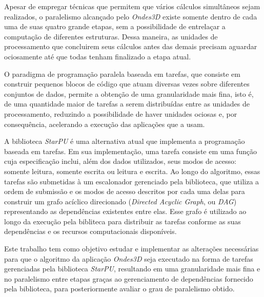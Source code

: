 \documentclass[cic,tc]{iiufrgs}
\begin{document}
Apesar de empregar técnicas que permitem que vários cálculos simultâneos sejam realizados, o paralelismo alcançado pelo \textit{Ondes3D} existe somente dentro de cada uma de suas
quatro grande etapas, sem a possibilidade de entrelaçar a computação de diferentes estruturas. Dessa maneira, as unidades de processamento que concluirem seus cálculos antes das
demais precisam aguardar ociosamente até que todas tenham finalizado a etapa atual.

O paradigma de programação paralela baseada em tarefas, que consiste em construir pequenos blocos de código que atuam diversas vezes sobre diferentes conjuntos de dados, permite a
obtenção de uma granularidade mais fina, isto é, de uma quantidade maior de tarefas a serem distribuídas entre as unidades de processamento, reduzindo a possibilidade de haver
unidades ociosas e, por consequência, acelerando a execução das aplicações que a usam.

A biblioteca \textit{StarPU} é uma alternativa atual que implementa a programação baseada em tarefas. Em sua implementação, uma tarefa consiste em uma função cuja especificação
inclui, além dos dados utilizados, seus modos de acesso: somente leitura, somente escrita ou leitura e escrita. Ao longo do algoritmo, essas tarefas são submetidas à um escalonador
gerenciado pela biblioteca, que utiliza a ordem de submissão e os modos de acesso descritos por cada uma delas para construir um grafo acíclico direcionado (\textit{Directed Acyclic 
  Graph}, ou \textit{DAG}) representando as dependências existentes entre elas. Esse grafo é utilizado ao longo da execução pela bibliteca para distribuir as tarefas conforme as suas
dependências e os recursos computacionais disponíveis.

Este trabalho tem como objetivo estudar e implementar as alterações necessárias para que o algoritmo da aplicação \textit{Ondes3D} seja executado na forma de tarefas gerenciadas
pela biblioteca \textit{StarPU}, resultando em uma granularidade mais fina e no paralelismo entre etapas graças ao gerenciamento de dependências fornecido pela biblioteca, para
posteriormente avaliar o grau de paralelismo obtido.
\end{document}

